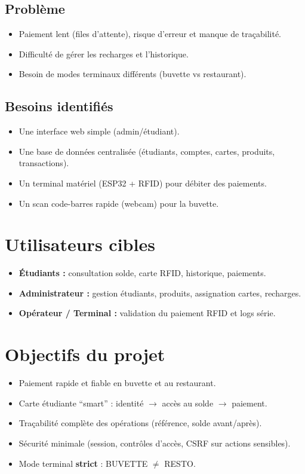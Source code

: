 \documentclass[12pt,a4paper]{report}
\begin{document}
\subsection{Problème}
\begin{itemize}
  \item Paiement lent (files d’attente), risque d’erreur et manque de traçabilité.
  \item Difficulté de gérer les recharges et l’historique.
  \item Besoin de modes terminaux différents (buvette vs restaurant).
\end{itemize}

\subsection{Besoins identifiés}
\begin{itemize}
  \item Une interface web simple (admin/étudiant).
  \item Une base de données centralisée (étudiants, comptes, cartes, produits, transactions).
  \item Un terminal matériel (ESP32 + RFID) pour débiter des paiements.
  \item Un scan code-barres rapide (webcam) pour la buvette.
\end{itemize}

\section{Utilisateurs cibles}
\begin{itemize}
  \item \textbf{Étudiants :} consultation solde, carte RFID, historique, paiements.
  \item \textbf{Administrateur :} gestion étudiants, produits, assignation cartes, recharges.
  \item \textbf{Opérateur / Terminal :} validation du paiement RFID et logs série.
\end{itemize}

\section{Objectifs du projet}
\begin{itemize}
  \item Paiement rapide et fiable en buvette et au restaurant.
  \item Carte étudiante “smart” : identité \(\rightarrow\) accès au solde \(\rightarrow\) paiement.
  \item Traçabilité complète des opérations (référence, solde avant/après).
  \item Sécurité minimale (session, contrôles d’accès, CSRF sur actions sensibles).
  \item Mode terminal \textbf{strict} : BUVETTE \(\neq\) RESTO.
\end{itemize}
\end{document}
